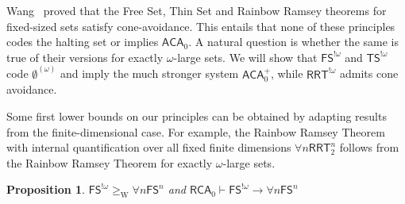 \documentclass[10pt,a4paper]{article}
\newcommand{\RCA}[0]{\mathsf{RCA}}
\newcommand{\ACA}[0]{\mathsf{ACA}}
\newcommand{\RRT}[0]{\mathsf{RRT}}
\newcommand{\FS}[0]{\mathsf{FS}}
\newcommand{\TS}[0]{\mathsf{TS}}
\newcommand{\NN}[0]{\mathbb{N}}
\newcommand{\W}{\mathrm{W}}
\numberwithin{theorem}{section}
\newtheorem{proposition}[theorem]{Proposition}
\begin{document}

Wang~\cite{wang2014some} proved that the Free Set, Thin Set and Rainbow Ramsey theorems for fixed-sized sets satisfy cone-avoidance. This entails that none of these principles codes the halting set or implies $\ACA_0$.
A natural question is whether the same is true of their versions for exactly $\omega$-large sets.
We will show that $\FS^{!\omega}$ and $\TS^{!\omega}$ code $\emptyset^{(\omega)}$ and imply the much stronger system $\ACA_0^+$, while $\RRT^{!\omega}$ admits cone avoidance.

\bigskip

Some first lower bounds on our principles can be obtained by adapting results from the finite-dimensional case. For example, the Rainbow Ramsey Theorem with internal quantification over all fixed finite dimensions $\forall n \RRT^n_2$ follows from the Rainbow Ramsey Theorem for exactly $\omega$-large sets. 

\iffalse
\begin{proposition}
$\FS^{!\omega} \geq_{\W} \forall n \FS^n$ and $\RCA_0\vdash \FS^{!\omega} \to \forall n \FS^n$
\end{proposition}
\end{document}
